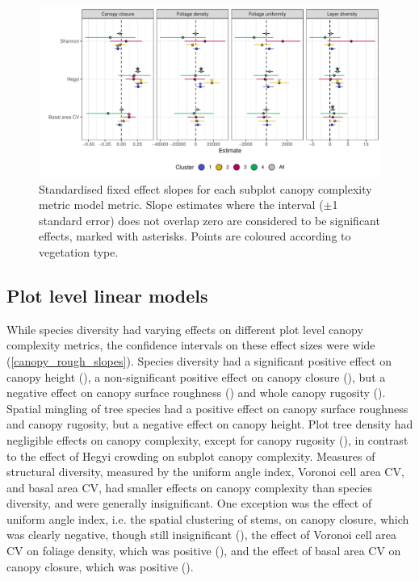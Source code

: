 \documentclass[11pt,a4paper]{article}
\begin{document}
\begin{figure}
	\includegraphics[width=\linewidth]{height_profile_mod_rich_slopes_sites}
	\caption{Standardised fixed effect slopes for each subplot canopy complexity metric model metric. Slope estimates where the interval ($\pm$1 standard error) does not overlap zero are considered to be significant effects, marked with asterisks. Points are coloured according to vegetation type.}
	\label{height_profile_mod_rich_slopes_sites}
\end{figure}



\subsection{Plot level linear models}

While species diversity had varying effects on different plot level canopy complexity metrics, the confidence intervals on these effect sizes were wide (\autoref{canopy_rough_slopes}). Species diversity had a significant positive effect on canopy height (\shannonHeightP{}), a non-significant positive effect on canopy closure (\shannonCoverP{}), but a negative effect on canopy surface roughness (\shannonRoughP{}) and whole canopy rugosity (\shannonRugP{}). Spatial mingling of tree species had a positive effect on canopy surface roughness and canopy rugosity, but a negative effect on canopy height. Plot tree density had negligible effects on canopy complexity, except for canopy rugosity (\treeDensRugP{}), in contrast to the effect of Hegyi crowding on subplot canopy complexity. Measures of structural diversity, measured by the uniform angle index, Voronoi cell area CV, and basal area CV, had smaller effects on canopy complexity than species diversity, and were generally insignificant. One exception was the effect of uniform angle index, i.e. the spatial clustering of stems, on canopy closure, which was clearly negative, though still insignificant (\wiCoverP{}), the effect of Voronoi cell area CV on foliage density, which was positive (\voronoiDensP{}), and the effect of basal area CV on canopy closure, which was positive (\baCoverP{}). 
\end{document}
